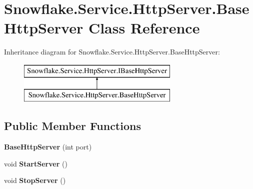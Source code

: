 \hypertarget{class_snowflake_1_1_service_1_1_http_server_1_1_base_http_server}{}\section{Snowflake.\+Service.\+Http\+Server.\+Base\+Http\+Server Class Reference}
\label{class_snowflake_1_1_service_1_1_http_server_1_1_base_http_server}


 


Inheritance diagram for Snowflake.\+Service.\+Http\+Server.\+Base\+Http\+Server\+:\begin{figure}[H]
\begin{center}
\leavevmode
\includegraphics[height=2.000000cm]{class_snowflake_1_1_service_1_1_http_server_1_1_base_http_server}
\end{center}
\end{figure}
\subsection*{Public Member Functions}
\begin{DoxyCompactItemize}
\item 
\hypertarget{class_snowflake_1_1_service_1_1_http_server_1_1_base_http_server_a1d7d941bea5a2d1a8856c0be94a2f1a7}{}{\bfseries Base\+Http\+Server} (int port)\label{class_snowflake_1_1_service_1_1_http_server_1_1_base_http_server_a1d7d941bea5a2d1a8856c0be94a2f1a7}

\item 
\hypertarget{class_snowflake_1_1_service_1_1_http_server_1_1_base_http_server_a277f3db1a4fc105580487c6fa5023df9}{}void {\bfseries Start\+Server} ()\label{class_snowflake_1_1_service_1_1_http_server_1_1_base_http_server_a277f3db1a4fc105580487c6fa5023df9}

\item 
\hypertarget{class_snowflake_1_1_service_1_1_http_server_1_1_base_http_server_a628c25e83a0a971de4009cc325aa78ab}{}void {\bfseries Stop\+Server} ()\label{class_snowflake_1_1_service_1_1_http_server_1_1_base_http_server_a628c25e83a0a971de4009cc325aa78ab}

\end{DoxyCompactItemize}
